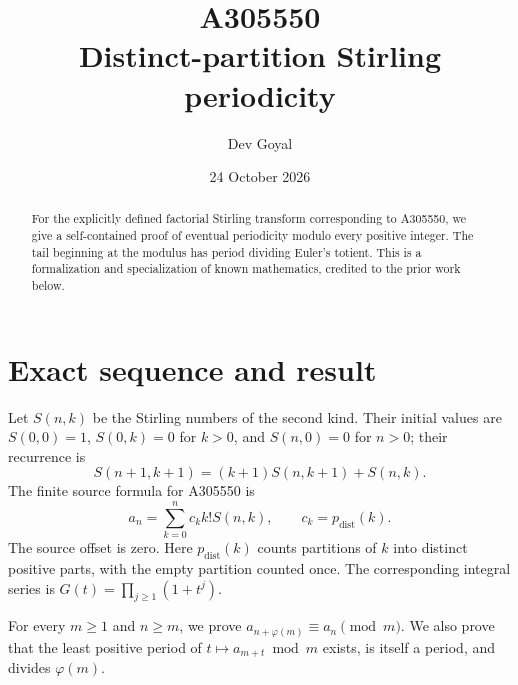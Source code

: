 \documentclass[11pt,a4paper]{article}
\title{A305550\\[3pt]Distinct-partition Stirling periodicity}
\author{Dev Goyal}
\date{24 October 2026}
\theoremstyle{remark}
\begin{document}
\maketitle
\begin{center}
\end{center}
\begin{abstract}
For the explicitly defined factorial Stirling transform corresponding to A305550, we give a self-contained proof of eventual periodicity modulo every positive integer. The tail beginning at the modulus has period dividing Euler's totient. This is a formalization and specialization of known mathematics, credited to the prior work below.
\end{abstract}
\section{Exact sequence and result}
Let $S(n,k)$ be the Stirling numbers of the second kind. Their initial
values are $S(0,0)=1$, $S(0,k)=0$ for $k>0$, and $S(n,0)=0$ for
$n>0$; their recurrence is
\[
S(n+1,k+1)=(k+1)S(n,k+1)+S(n,k).
\]
The finite source formula for A305550 \cite{oeis} is
\[
a_n=\sum_{k=0}^n c_k k!S(n,k),\qquad c_k=p_{\mathrm{dist}}(k).
\]
The source offset is zero. Here $p_{\mathrm{dist}}(k)$ counts partitions of $k$ into distinct positive parts, with the empty partition counted once. The corresponding integral series is $G(t)=\prod_{j\ge1}(1+t^j)$.

For every $m\ge1$ and $n\ge m$, we prove
$a_{n+\varphi(m)}\equiv a_n\pmod m$. We also prove that the least
positive period of $t\mapsto a_{m+t}\bmod m$ exists, is itself a
period, and divides $\varphi(m)$.
\end{document}

